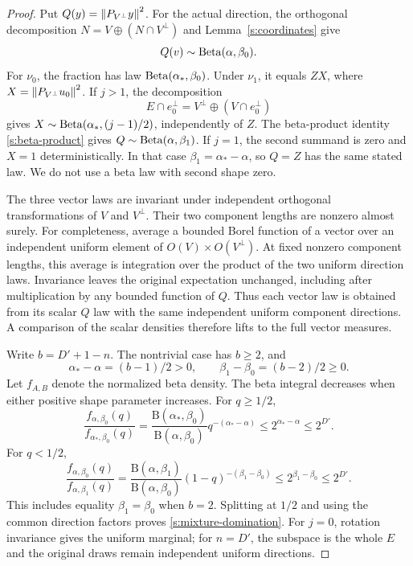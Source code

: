 \begin{proof}
Put \(Q(y)=\left\lVert P_{V^\perp}y\right\rVert^2\). For the actual direction, the
orthogonal decomposition \(N=V\oplus(N\cap V^\perp)\) and
Lemma~\ref{s:coordinates} give
\[
 Q(v)\sim\operatorname{Beta}(\alpha,\beta_0).
\]
For \(\nu_0\), the fraction has law
\(\operatorname{Beta}(\alpha_*,\beta_0)\). Under \(\nu_1\), it equals \(ZX\),
where \(X=\left\lVert P_{V^\perp}u_0\right\rVert^2\). If \(j>1\), the decomposition
\[
 E\cap e_0^\perp=V^\perp\oplus(V\cap e_0^\perp)
\]
gives \(X\sim\operatorname{Beta}(\alpha_*,(j-1)/2)\), independently of \(Z\).
The beta-product identity \eqref{s:beta-product} gives
\(Q\sim\operatorname{Beta}(\alpha,\beta_1)\). If \(j=1\), the second summand is
zero and \(X=1\) deterministically. In that case
\(\beta_1=\alpha_*-\alpha\), so \(Q=Z\) has the same stated law.
We do not use a beta law with second shape zero.

The three vector laws are invariant under independent orthogonal
transformations of \(V\) and \(V^\perp\). Their two component lengths
are nonzero almost surely. For completeness, average a bounded Borel
function of a vector over an independent uniform element of
\(O(V)\times O(V^\perp)\). At fixed nonzero component lengths, this
average is integration over the product of the two uniform direction
laws. Invariance leaves the original expectation unchanged, including
after multiplication by any bounded function of \(Q\). Thus each
vector law is obtained from its scalar \(Q\) law with the same
independent uniform component directions. A comparison of the scalar
densities therefore lifts to the full vector measures.

Write \(b=D'+1-n\). The nontrivial case has \(b\ge2\), and
\[
 \alpha_*-\alpha=(b-1)/2>0,\qquad
 \beta_1-\beta_0=(b-2)/2\ge0.
\]
Let \(f_{A,B}\) denote the normalized beta density. The beta integral
decreases when either positive shape parameter increases. For
\(q\ge1/2\),
\[
 \frac{f_{\alpha,\beta_0}(q)}{f_{\alpha_*,\beta_0}(q)}
 =\frac{\mathrm B(\alpha_*,\beta_0)}
        {\mathrm B(\alpha,\beta_0)}
       q^{-(\alpha_*-\alpha)}
 \le2^{\alpha_*-\alpha}\le2^{D'}.
\]
For \(q<1/2\),
\[
 \frac{f_{\alpha,\beta_0}(q)}{f_{\alpha,\beta_1}(q)}
 =\frac{\mathrm B(\alpha,\beta_1)}
        {\mathrm B(\alpha,\beta_0)}
       (1-q)^{-(\beta_1-\beta_0)}
 \le2^{\beta_1-\beta_0}\le2^{D'}.
\]
This includes equality \(\beta_1=\beta_0\) when \(b=2\).
Splitting at \(1/2\) and using the common direction factors proves
\eqref{s:mixture-domination}. For \(j=0\), rotation invariance gives
the uniform marginal; for \(n=D'\), the subspace is the whole \(E\)
and the original draws remain independent uniform directions.
\end{proof}

